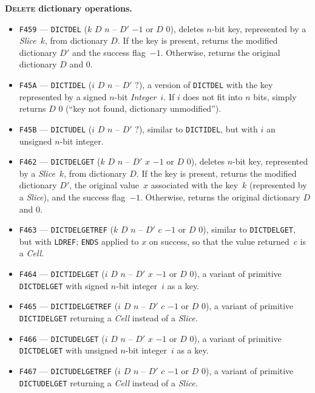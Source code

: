 \documentclass[12pt,oneside]{article}
\def\makepoint#1{\medbreak\noindent{\bf #1.\ }}
\def\nxsubpoint{\refstepcounter{subsubsection}%
    \smallbreak\makepoint{\thesubsubsection}}
\def\emb#1{\textbf{#1.}}
\begin{document}
\nxsubpoint\label{sp:prim.dict.delete}\emb{\textsc{Delete} dictionary operations}
\begin{itemize}
\item {\tt F459} --- {\tt DICTDEL} ($k$ $D$ $n$ -- $D'$ $-1$ or $D$ $0$), deletes $n$-bit key, represented by a {\em Slice}~$k$, from dictionary $D$. If the key is present, returns the modified dictionary $D'$ and the success flag~$-1$. Otherwise, returns the original dictionary $D$ and $0$.
\item {\tt F45A} --- {\tt DICTIDEL} ($i$ $D$ $n$ -- $D'$ $?$), a version of {\tt DICTDEL} with the key represented by a signed $n$-bit {\em Integer}~$i$. If $i$ does not fit into $n$ bits, simply returns $D$ $0$ (``key not found, dictionary unmodified'').
\item {\tt F45B} --- {\tt DICTUDEL} ($i$ $D$ $n$ -- $D'$ $?$), similar to {\tt DICTIDEL}, but with $i$ an unsigned $n$-bit integer.
\item {\tt F462} --- {\tt DICTDELGET} ($k$ $D$ $n$ -- $D'$ $x$ $-1$ or $D$ $0$), deletes $n$-bit key, represented by a {\em Slice}~$k$, from dictionary $D$. If the key is present, returns the modified dictionary $D'$, the original value~$x$ associated with the key~$k$ (represented by a {\em Slice}), and the success flag~$-1$. Otherwise, returns the original dictionary $D$ and $0$.
\item {\tt F463} --- {\tt DICTDELGETREF} ($k$ $D$ $n$ -- $D'$ $c$ $-1$ or $D$ $0$), similar to {\tt DICTDELGET}, but with {\tt LDREF}; {\tt ENDS} applied to $x$ on success, so that the value returned~$c$ is a {\em Cell}.
\item {\tt F464} --- {\tt DICTIDELGET} ($i$ $D$ $n$ -- $D'$ $x$ $-1$ or $D$ $0$), a variant of primitive {\tt DICTDELGET} with signed $n$-bit integer~$i$ as a key.
\item {\tt F465} --- {\tt DICTIDELGETREF} ($i$ $D$ $n$ -- $D'$ $c$ $-1$ or $D$ $0$), a variant of primitive {\tt DICTIDELGET} returning a {\em Cell\/} instead of a {\em Slice.}
\item {\tt F466} --- {\tt DICTUDELGET} ($i$ $D$ $n$ -- $D'$ $x$ $-1$ or $D$ $0$), a variant of primitive {\tt DICTDELGET} with unsigned $n$-bit integer~$i$ as a key.
\item {\tt F467} --- {\tt DICTUDELGETREF} ($i$ $D$ $n$ -- $D'$ $c$ $-1$ or $D$ $0$), a variant of primitive {\tt DICTUDELGET} returning a {\em Cell\/} instead of a {\em Slice.}
\end{itemize}
\end{document}
